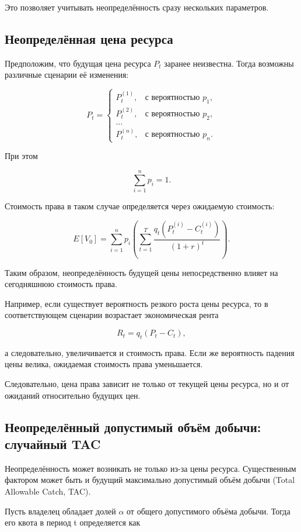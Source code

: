 \documentclass[12pt]{article}
\begin{document}
Это позволяет учитывать неопределённость сразу нескольких параметров.

\subsection{Неопределённая цена ресурса}

Предположим, что будущая цена ресурса $P_t$ заранее неизвестна. Тогда возможны различные сценарии её изменения:

\[
P_t =
\begin{cases}
P_t^{(1)}, & \text{с вероятностью }p_1,\\
P_t^{(2)}, & \text{с вероятностью }p_2,\\
\ldots \\
P_t^{(n)}, & \text{с вероятностью }p_n.
\end{cases}
\]

При этом

\[
\sum_{i=1}^{n}p_i=1.
\]

Стоимость права в таком случае определяется через ожидаемую стоимость:

\[
E[V_0] = \sum_{i=1}^{n}
p_i
\left(
\sum_{t=1}^{T}
\frac{q_t(P_t^{(i)}-C_t^{(i)})}
{(1+r)^t}
\right).
\]

Таким образом, неопределённость будущей цены непосредственно влияет на сегодняшнюю стоимость права.

Например, если существует вероятность резкого роста цены ресурса, то в соответствующем сценарии возрастает экономическая рента

\[
R_t=q_t(P_t-C_t),
\]

а следовательно, увеличивается и стоимость права. Если же вероятность падения цены велика, ожидаемая стоимость права уменьшается.

Следовательно, цена права зависит не только от текущей цены ресурса, но и от ожиданий относительно будущих цен.

\subsection{Неопределённый допустимый объём добычи: случайный TAC}

Неопределённость может возникать не только из-за цены ресурса. Существенным фактором может быть и будущий максимально допустимый объём добычи (Total Allowable Catch, TAC).

Пусть владелец обладает долей $\alpha$ от общего допустимого объёма добычи. Тогда его квота в период t определяется как
\end{document}
